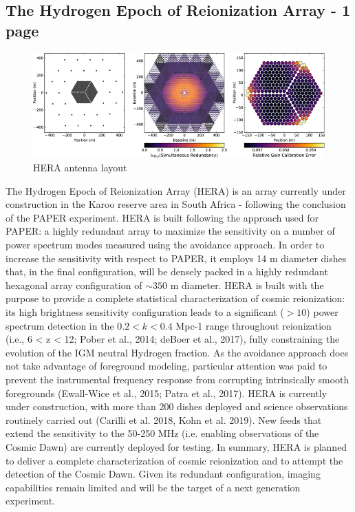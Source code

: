 \subsection{The Hydrogen Epoch of Reionization Array - 1 page}
\begin{figure}[]
\begin{center}
\includegraphics[width=1.\textwidth]{Koopmans_Bernardi/hera_layout}
\end{center}
\caption{HERA antenna layout}
\label{fig:fig_hera}
\end{figure}
The Hydrogen Epoch of Reionization Array (HERA) is an array currently under construction in the Karoo reserve area in South Africa - following the conclusion of the PAPER experiment. HERA is built following the approach used for PAPER: a highly redundant array to maximize the sensitivity on a number of power spectrum modes measured using the avoidance approach. In order to increase the sensitivity with respect to PAPER, it employs 14 m diameter dishes that, in the final configuration, will be densely packed in a highly redundant hexagonal array configuration of $\sim 350$ m diameter. 
HERA is built with the purpose to provide a complete statistical characterization of cosmic reionization: its high brightness sensitivity configuration leads to a significant ($> 10$) power spectrum detection in the $0.2 < k < 0.4$ Mpc-1 range throughout reionization (i.e., 6 < z < 12; Pober et al., 2014; deBoer et al., 2017), fully constraining the evolution of the IGM neutral Hydrogen fraction. As the avoidance approach does not take advantage of foreground modeling, particular attention was paid to prevent the instrumental frequency response from corrupting intrinsically smooth foregrounds (Ewall-Wice et al., 2015; Patra et al., 2017).
HERA is currently under construction, with more than 200 dishes deployed and science observations routinely carried out (Carilli et al. 2018, Kohn et al. 2019). New feeds that extend the sensitivity to the 50-250 MHz (i.e. enabling observations of the Cosmic Dawn) are currently deployed for testing.
In summary, HERA is planned to deliver a complete characterization of cosmic reionization and to attempt the detection of the Cosmic Dawn. Given its redundant configuration, imaging capabilities remain limited and will be the target of a next generation experiment.


